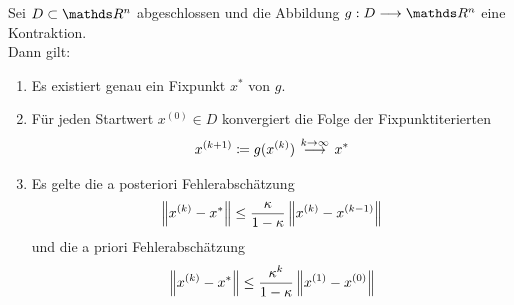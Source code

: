 \begin{Satze}
  \label{5.2.4}
  Sei $D\subset \R^n$ abgeschlossen und die Abbildung $g:D\longrightarrow \R^n$  eine Kontraktion. \\
  Dann gilt:
  \begin{enumerate}[1)]
  \item Es existiert genau ein Fixpunkt $x^{*}$ von $g$.
  \item Für jeden Startwert $x^{(0)}\in D$ konvergiert die Folge der Fixpunktiterierten
    \begin{gather}
      x^{(k+1)} \coloneqq g(x^{(k)})  ~
      \overset{\mathclap{k\rightarrow \infty}}{\longrightarrow}~ x^{*}
      \label{V.2.5}
    \end{gather}
  \item Es gelte die a posteriori Fehlerabschätzung
    \begin{gather}
      \nn[x^{(k)}-x^{*}] \leq \frac{\kappa}{1-\kappa} \nn[x^{(k)}-x^{(k-1)}]
      \label{V.2.6}
    \end{gather}
    und die a priori Fehlerabschätzung
    \begin{gather}
      \nn[x^{(k)}-x^{*}] \leq \frac{\kappa^k}{1-\kappa} \nn[x^{(1)}-x^{(0)} ]
      \label{V.2.7}
    \end{gather}
  \end{enumerate}
\end{Satze}


